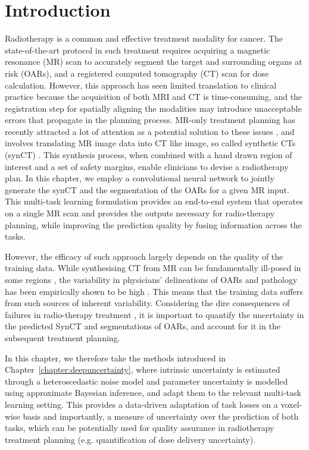 \section{Introduction}
Radiotherapy is a common and effective treatment modality for cancer. The state-of-the-art protocol in such treatment requires acquiring a magnetic resonance (MR) scan to accurately segment the target and surrounding organs at risk (OARs), and a registered computed tomography (CT) scan for dose calculation. However, this approach has seen limited translation to clinical practice because the acquisition of both MRI and CT is time-consuming, and the registration step for spatially aligning the modalities may introduce unacceptable errors that propagate in the planning process. MR-only treatment planning has recently attracted a lot of attention as a potential solution to these issues \cite{christiansen2017magnetic,tyagi2017clinical,tenhunen2018mri,jonsson2019rationale}, and involves translating MR image data into CT like image, so called synthetic CTs (synCT)  \cite{edmund2017review,johnstone2018systematic}. This synthesis process, when combined with a hand drawn region of interest and a set of safety margins, enable clinicians to devise a radiotherapy plan. In this chapter, we employ a convolutional neural network to jointly generate the synCT and the segmentation of the OARs for a given MR input. This multi-task learning formulation \cite{caruana1997multitask} provides an end-to-end system that operates on a single MR scan and provides the outputs necessary for radio-therapy planning, while improving the prediction quality by fusing information across the tasks. 

However, the efficacy of such approach largely depends on the quality of the training data. While synthesising CT from MR can be fundamentally ill-posed in some regions \cite{cardoso2015template}, the variability in physicians' delineations of OARs and pathology has been empirically shown to be high \cite{parker2003magnetic,milosevic1998magnetic}. This means that the training data suffers from such sources of inherent variability. Considering the dire consequences of failures in radio-therapy treatment \cite{milosevic1998magnetic,international2001investigation,wack2007summary}, it is important to quantify the uncertainty in the predicted SynCT and segmentations of OARs, and account for it in the subsequent treatment planning. 

In this chapter, we therefore take the methods introduced in Chapter~\ref{chapter:deepuncertainty}, where intrinsic uncertainty is estimated through a heteroscedastic noise model and parameter uncertainty is modelled using approximate Bayesian inference, and adapt them to the relevant multi-task learning setting. This provides a data-driven adaptation of task losses on a voxel-wise basis and importantly, a measure of uncertainty over the prediction of both tasks, which can be potentially used for quality assurance in radiotherapy treatment planning (e.g. quantification of dose delivery uncertainty). 


